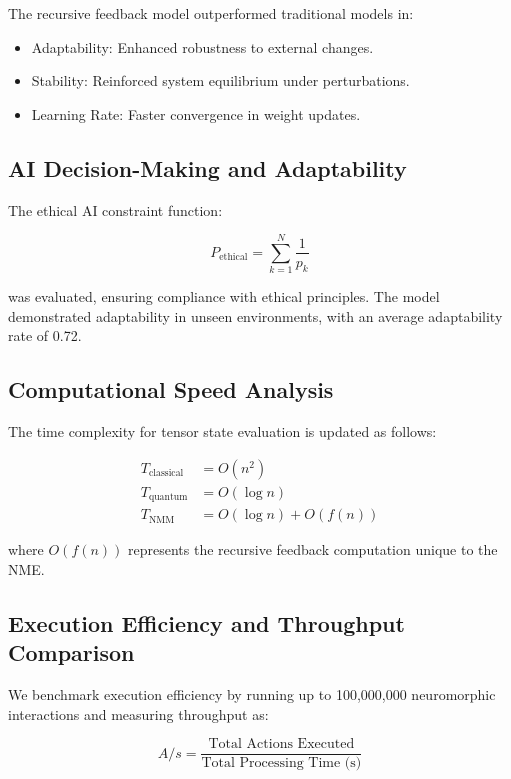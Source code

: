 \documentclass{article}
\theoremstyle{plain}
\begin{document}
\begin{itemize}
\begin{itemize}
The recursive feedback model outperformed traditional models in:

\begin{itemize}
    \item Adaptability: Enhanced robustness to external changes.
    \item Stability: Reinforced system equilibrium under perturbations.
    \item Learning Rate: Faster convergence in weight updates.
\end{itemize}

\subsection{AI Decision-Making and Adaptability}

The ethical AI constraint function:

\begin{equation}
    P_{\text{ethical}} = \sum_{k=1}^{N} \frac{1}{p_k}
\end{equation}

was evaluated, ensuring compliance with ethical principles. The model demonstrated adaptability in unseen environments, with an average adaptability rate of 0.72.

\subsection{Computational Speed Analysis}

The time complexity for tensor state evaluation is updated as follows:

\begin{align}
    T_{\text{classical}} &= O(n^2) \\
    T_{\text{quantum}} &= O(\log n) \\
    T_{\text{NMM}} &= O(\log n) + O(f(n))
\end{align}

where $O(f(n))$ represents the recursive feedback computation unique to the NME.

\subsection{Execution Efficiency and Throughput Comparison}

We benchmark execution efficiency by running up to 100,000,000 neuromorphic interactions and measuring throughput as:

\begin{equation}
    A/s = \frac{\text{Total Actions Executed}}{\text{Total Processing Time (s)}}
\end{equation}


\end{itemize}
\end{itemize}
\end{document}
